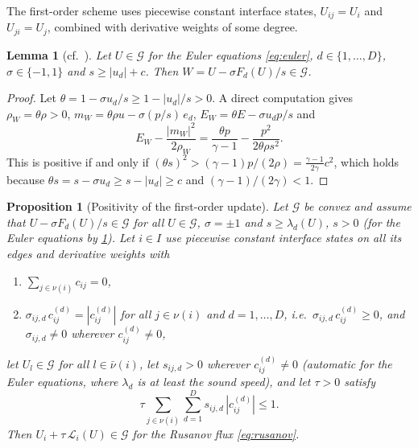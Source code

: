 \documentclass[11pt,a4paper]{article}
\theoremstyle{plain}
\newtheorem{proposition}[theorem]{Proposition}
\newtheorem{lemma}[theorem]{Lemma}
\theoremstyle{definition}
\theoremstyle{remark}
\numberwithin{equation}{section}
\newcommand{\nb}{\nu}
\newcommand{\cnb}{\bar\nu}
\newcommand{\Ad}{\mathcal{G}}
\newcommand{\Lop}{\mathcal{L}}
\begin{document}
The first-order scheme uses piecewise constant interface states, $U_{ij}=U_i$ and $U_{ji}=U_j$, combined with derivative weights of some degree.

\begin{lemma}[cf.\ \cite{PerthameShu1996,ZhangShu2010}]\label{lem:lfstates}
Let $U\in\Ad$ for the Euler equations \eqref{eq:euler}, $d\in\{1,\dots,D\}$, $\sigma\in\{-1,1\}$ and $s\ge|u_d|+c$. Then $W=U-\sigma F_d(U)/s\in\Ad$.
\end{lemma}

\begin{proof}
Let $\theta=1-\sigma u_d/s\ge1-|u_d|/s>0$. A direct computation gives $\rho_W=\theta\rho>0$, $m_W=\theta\rho u-\sigma(p/s)\,e_d$, $E_W=\theta E-\sigma u_dp/s$ and
\begin{equation*}
E_W-\frac{|m_W|^2}{2\rho_W}=\frac{\theta p}{\gamma-1}-\frac{p^2}{2\theta\rho s^2}.
\end{equation*}
This is positive if and only if $(\theta s)^2>(\gamma-1)p/(2\rho)=\frac{\gamma-1}{2\gamma}c^2$, which holds because $\theta s=s-\sigma u_d\ge s-|u_d|\ge c$ and $(\gamma-1)/(2\gamma)<1$.
\end{proof}

\begin{proposition}[Positivity of the first-order update]\label{prop:positivity}
Let $\Ad$ be convex and assume that $U-\sigma F_d(U)/s\in\Ad$ for all $U\in\Ad$, $\sigma=\pm1$ and $s\ge\lambda_d(U)$, $s>0$ (for the Euler equations by \cref{lem:lfstates}). Let $i\in I$ use piecewise constant interface states on all its edges and derivative weights with
\begin{enumerate}[label=(\alph*)]
\item $\sum_{j\in\nb(i)}c_{ij}=0$,
\item $\sigma_{ij,d}\,c^{(d)}_{ij}=|c^{(d)}_{ij}|$ for all $j\in\nb(i)$ and $d=1,\dots,D$, i.e.\ $\sigma_{ij,d}\,c^{(d)}_{ij}\ge0$, and $\sigma_{ij,d}\ne0$ wherever $c^{(d)}_{ij}\ne0$,
\end{enumerate}
let $U_l\in\Ad$ for all $l\in\cnb(i)$, let $s_{ij,d}>0$ wherever $c^{(d)}_{ij}\ne0$ (automatic for the Euler equations, where $\lambda_d$ is at least the sound speed), and let $\tau>0$ satisfy
\begin{equation}\label{eq:cflpos}
\tau\sum_{j\in\nb(i)}\sum_{d=1}^Ds_{ij,d}\,|c^{(d)}_{ij}|\le1 .
\end{equation}
Then $U_i+\tau\,\Lop_i(U)\in\Ad$ for the Rusanov flux \eqref{eq:rusanov}.
\end{proposition}
\end{document}
